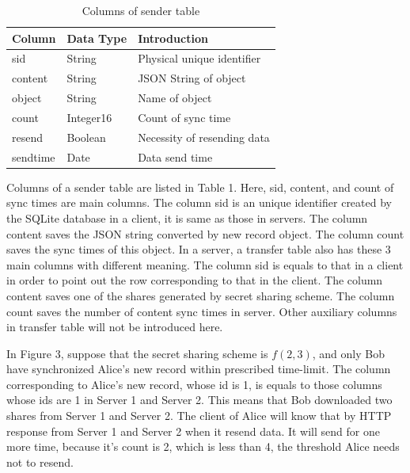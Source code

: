 \documentclass[twocolumn,10pt]{article}
\begin{document}
\begin{table}[tbp]
	\centering  
	\begin{tabular}{lll}  
		\hline
		Column &Data Type & Introduction\\ 
		\hline  
		sid &String & Physical unique identifier\\
		content & String & JSON String of object\\ 
		object & String & Name of object\\
		count & Integer16 & Count of sync time\\
		resend & Boolean &Necessity of resending data \\
		sendtime & Date & Data send time\\
		\hline
	\end{tabular}
	\caption{Columns of sender table}
\end{table}

Columns of a sender table are listed in Table 1. Here, sid, content, and count of sync times are main columns. The column  sid is an unique identifier created by the SQLite database in a client, it is same as those in servers. The column content saves the JSON string converted by new record object. The column count saves the sync times of this object. In a server, a transfer table also has these 3 main columns with different meaning. The column sid is equals to that in a client in order to point out the row corresponding to that in the client. The column content saves one of the shares generated by secret sharing scheme. The column count saves the number of content sync times in server. Other auxiliary columns in transfer table will not be introduced here.

In Figure 3, suppose that the secret sharing scheme is $f(2, 3)$, and only Bob have synchronized Alice's new record within prescribed time-limit. The column corresponding to Alice's new record, whose id is 1, is equals to those columns whose ids are 1 in Server 1 and Server 2. This means that Bob downloaded two shares from Server 1 and Server 2. The client of Alice will know that by HTTP response from Server 1 and Server 2 when it resend data. It will send for one more time, because it's count is 2, which is less than 4, the threshold Alice needs not to resend.
\end{document}
